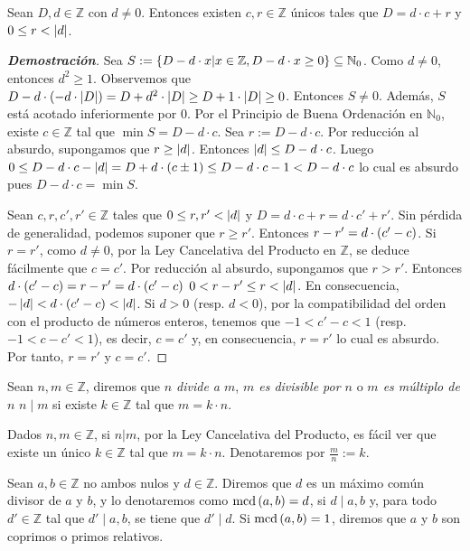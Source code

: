 \begin{theorem}\label{Teorema de la División Euclídea}
  \rm Sean $D,d\in\mathbb{Z}$ con $d\neq 0$. Entonces existen $c,r\in\mathbb{Z}$ únicos tales que $D=d\cdot c+r$ y $0\leq r<\left|d\right|$.
  \begin{proof}[\rm\textbf{Demostración}]
    Sea $S:=\left\{D-d\cdot x\middle|x\in\mathbb{Z},D-d\cdot x\geq 0\right\}\subseteq \mathbb{N}_0$. Como $d\neq 0$, entonces $d^2\geq 1$. Observemos que $D-d\cdot\left(-d\cdot\left|D\right|\right)=D+d^2\cdot\left|D\right|\geq D+1\cdot\left|D\right|\geq 0$. Entonces $S\neq 0$. Además, $S$ está acotado inferiormente por $0$. Por el Principio de Buena Ordenación en $\mathbb{N}_0$, existe $c\in\mathbb{Z}$ tal que $\min S=D-d\cdot c$. Sea $r:=D-d\cdot c$. Por reducción al absurdo, supongamos que $r\geq\left|d\right|$. Entonces $\left|d\right|\leq D-d\cdot c$. Luego $0\leq D-d\cdot c-\left|d\right|=D+d\cdot\left(c\pm 1\right)\leq D-d\cdot c-1<D-d\cdot c$ lo cual es absurdo pues $D-d\cdot c=\min S$. 

    Sean $c,r,c',r'\in\mathbb{Z}$ tales que $0\leq r,r'<\left|d\right|$ y $D=d\cdot c+r=d\cdot c'+r'$. Sin pérdida de generalidad, podemos suponer que $r\geq r'$. Entonces $r-r'=d\cdot\left(c'-c\right)$. Si $r=r'$, como $d\neq 0$, por la Ley Cancelativa del Producto en $\mathbb{Z}$, se deduce fácilmente que $c=c'$. Por reducción al absurdo, supongamos que $r>r'$. Entonces $d\cdot\left(c'-c\right)=r-r'=d\cdot\left(c'-c\right)$ $0<r-r'\leq r<\left|d\right|$. En consecuencia, $-\left|d\right|<d\cdot\left(c'-c\right)<\left|d\right|$. Si $d>0$ (resp. $d<0$), por la compatibilidad del orden con el producto de números enteros, tenemos que $-1<c'-c<1$ (resp. $-1<c-c'<1$), es decir, $c=c'$ y, en consecuencia, $r=r'$ lo cual es absurdo. Por tanto, $r=r'$ y $c=c'$.
  \end{proof}
\end{theorem}

\begin{definition}
  \rm Sean $n,m\in\mathbb{Z}$, diremos que \textit{$n$ divide a $m$}, \textit{$m$ es divisible por $n$} o \textit{$m$ es múltiplo de $n$} $n\mid m$ si existe $k\in\mathbb{Z}$ tal que $m=k\cdot n$.
\end{definition}

Dados $n,m\in\mathbb{Z}$, si $n|m$, por la Ley Cancelativa del Producto, es fácil ver que existe un único $k\in\mathbb{Z}$ tal que $m=k\cdot n$. Denotaremos por $\frac{m}{n}:=k$.

\begin{definition}
  \rm Sean $a,b\in\mathbb{Z}$ no ambos nulos y $d\in\mathbb{Z}$. Diremos que $d$ es un máximo común divisor de $a$ y $b$, y lo denotaremos como $\text{mcd}\left(a,b\right)=d$, si $d\mid a,b$ y, para todo $d'\in\mathbb{Z}$ tal que $d'\mid a,b$, se tiene que $d'\mid d$. Si $\text{mcd}\left(a,b\right)=1$, diremos que $a$ y $b$ son coprimos o primos relativos.
\end{definition}

